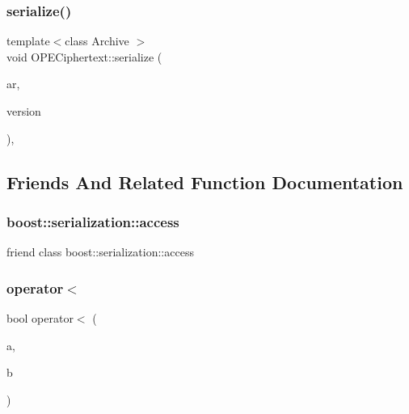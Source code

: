 \subsubsection{\texorpdfstring{serialize()}{serialize()}}
{\footnotesize\ttfamily template$<$class Archive $>$ \\
void O\+P\+E\+Ciphertext\+::serialize (\begin{DoxyParamCaption}\item[{Archive \&}]{ar,  }\item[{const unsigned int}]{version }\end{DoxyParamCaption})\hspace{0.3cm}{\ttfamily [inline]}, {\ttfamily [private]}}



\subsection{Friends And Related Function Documentation}
\mbox{\label{classOPECiphertext_ac98d07dd8f7b70e16ccb9a01abf56b9c}} 
\subsubsection{\texorpdfstring{boost\+::serialization\+::access}{boost::serialization::access}}
{\footnotesize\ttfamily friend class boost\+::serialization\+::access\hspace{0.3cm}{\ttfamily [friend]}}

\mbox{\label{classOPECiphertext_a7a856f70b6a7c9c384e5bcc59d4665ca}} 
\subsubsection{\texorpdfstring{operator$<$}{operator<}}
{\footnotesize\ttfamily bool operator$<$ (\begin{DoxyParamCaption}\item[{const \hyperlink{classOPECiphertext}{O\+P\+E\+Ciphertext} \&}]{a,  }\item[{const \hyperlink{classOPECiphertext}{O\+P\+E\+Ciphertext} \&}]{b }\end{DoxyParamCaption})\hspace{0.3cm}{\ttfamily [friend]}}

